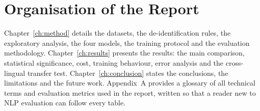 \section{Organisation of the Report}
\label{sec:org}

Chapter~\ref{ch:method} details the datasets, the de-identification rules, the
exploratory analysis, the four models, the training protocol and the evaluation
methodology. Chapter~\ref{ch:results} presents the results: the main comparison,
statistical significance, cost, training behaviour, error analysis and the
cross-lingual transfer test. Chapter~\ref{ch:conclusion} states the conclusions, the limitations and the future
work. Appendix~A provides a glossary of all technical terms and evaluation metrics
used in the report, written so that a reader new to NLP evaluation can follow every
table.

